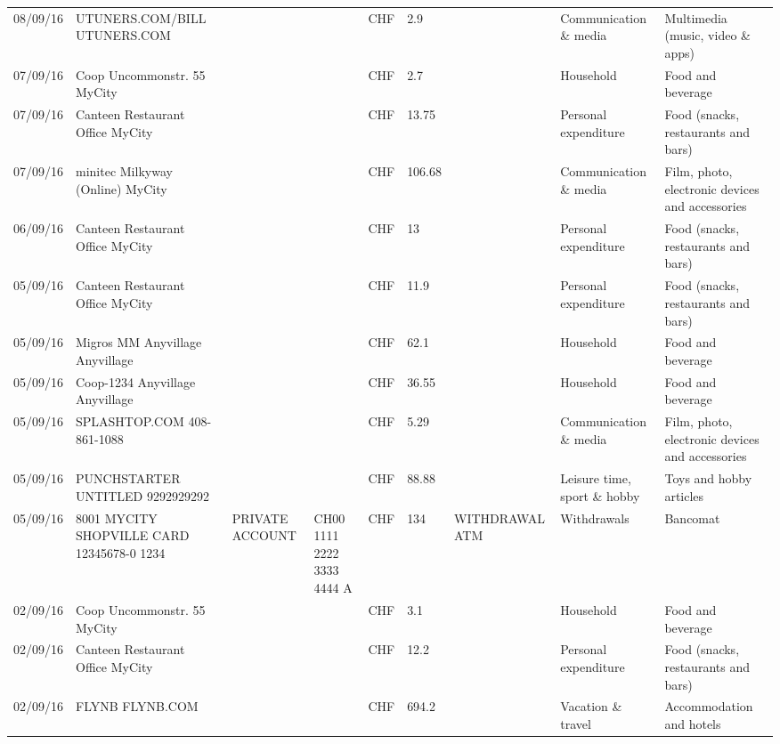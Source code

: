 \begin{landscape}
\begin{adjustwidth}{-2cm}{-2cm}
\begin{tiny}
\begin{longtable}{lp{4cm}llllp{3cm}ll}
		08/09/16 & UTUNERS.COM/BILL          UTUNERS.COM &       &       & CHF   & 2.9   &       & Communication \& media & Multimedia (music, video \& apps) \\
		07/09/16 & Coop Uncommonstr. 55   MyCity &       &       & CHF   & 2.7   &       & Household & Food and beverage \\
		07/09/16 & Canteen Restaurant Office      MyCity &       &       & CHF   & 13.75 &       & Personal expenditure & Food (snacks, restaurants and bars) \\
		07/09/16 & minitec Milkyway (Online) MyCity &       &       & CHF   & 106.68 &       & Communication \& media & Film, photo, electronic devices and accessories \\
		06/09/16 & Canteen Restaurant Office      MyCity &       &       & CHF   & 13    &       & Personal expenditure & Food (snacks, restaurants and bars) \\
		05/09/16 & Canteen Restaurant Office      MyCity &       &       & CHF   & 11.9  &       & Personal expenditure & Food (snacks, restaurants and bars) \\
		05/09/16 & Migros MM Anyvillage    Anyvillage &       &       & CHF   & 62.1  &       & Household & Food and beverage \\
		05/09/16 & Coop-1234 Anyvillage    Anyvillage &       &       & CHF   & 36.55 &       & Household & Food and beverage \\
		05/09/16 & SPLASHTOP.COM            408-861-1088 &       &       & CHF   & 5.29  &       & Communication \& media & Film, photo, electronic devices and accessories \\
		05/09/16 & PUNCHSTARTER UNTITLED     9292929292 &       &       & CHF   & 88.88 &       & Leisure time, sport \& hobby & Toys and hobby articles \\
		05/09/16 & 8001 MYCITY SHOPVILLE CARD 12345678-0 1234 & PRIVATE ACCOUNT & CH00 1111 2222 3333 4444 A & CHF   & 134   & WITHDRAWAL ATM & Withdrawals & Bancomat \\
		02/09/16 & Coop Uncommonstr. 55   MyCity &       &       & CHF   & 3.1   &       & Household & Food and beverage \\
		02/09/16 & Canteen Restaurant Office      MyCity &       &       & CHF   & 12.2  &       & Personal expenditure & Food (snacks, restaurants and bars) \\
		02/09/16 & FLYNB                   FLYNB.COM &       &       & CHF   & 694.2 &       & Vacation \& travel & Accommodation and hotels \\

\end{longtable}
\end{tiny}
\end{adjustwidth}
\end{landscape}
